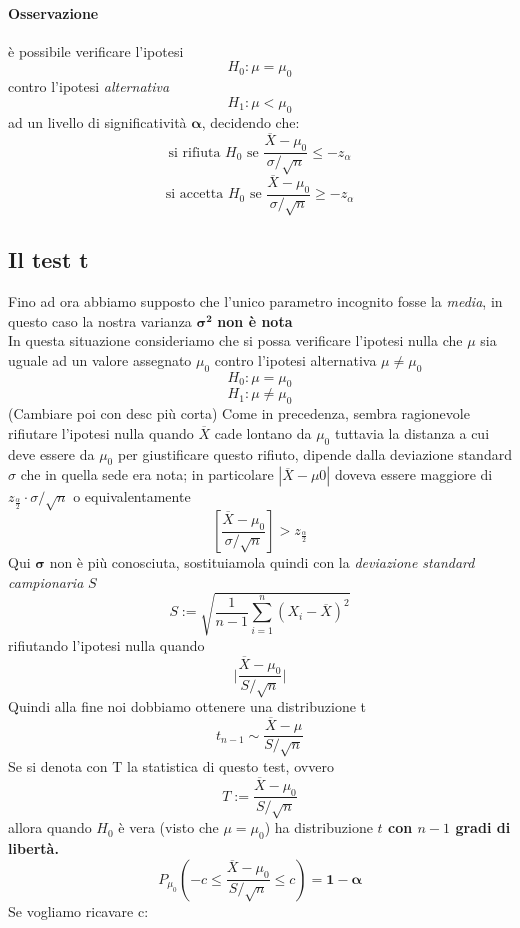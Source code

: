 \documentclass[]{article}
\begin{document}
    \paragraph{Osservazione} è possibile verificare l'ipotesi
    \[ H_0 : \mu = \mu_0 \]
    contro l'ipotesi \textit{alternativa}
    \[ H_1 : \mu < \mu_0 \]
    ad un livello di significatività $\boldsymbol{\alpha}$, decidendo che:
    \[ \text{si rifiuta } H_0 \text{ se } \frac{\overline{X} - \mu_0}{\sigma / \sqrt{n}} \leq -z_\alpha \]
    \[ \text{si accetta } H_0 \text{ se } \frac{\overline{X} - \mu_0}{\sigma / \sqrt{n}} \geq -z_\alpha \]
    \subsection{Il test t}
    Fino ad ora abbiamo supposto che l'unico parametro incognito fosse la \textit{media}, in questo caso la nostra varianza $\boldsymbol{\sigma^2}$ \textbf{non è nota} \\
    In questa situazione consideriamo che si possa verificare l'ipotesi nulla che $\mu$ sia uguale ad un valore assegnato $\mu_0$ contro l'ipotesi alternativa $\mu \not= \mu_0$
    \[ H_0 : \mu = \mu_0 \]
    \[ H_1 : \mu \not= \mu_0 \]
    (Cambiare poi con desc più corta)
    Come in precedenza, sembra ragionevole rifiutare l’ipotesi nulla quando $\overline{X}$ cade
    lontano da $\mu_0$ tuttavia la distanza a cui deve essere da $\mu_0$ per giustificare questo
    rifiuto, dipende dalla deviazione standard $\sigma$ che in quella sede era nota; in particolare
    $|\overline{X} - \mu0|$ doveva essere maggiore di $z_{\frac{\alpha}{2}} \cdot \sigma / \sqrt{n}$ o equivalentamente
    \[ \left[ \frac{\overline{X} - \mu_0}{\sigma / \sqrt{n}} \right] > z_{\frac{\alpha}{2}} \]
    Qui $\boldsymbol{\sigma}$ non è più conosciuta, sostituiamola quindi con la \textit{deviazione standard campionaria} $S$
    \[ S := \sqrt{\frac{1}{n-1} \sum_{i=1}^{n} (X_i - \overline{X})^2} \]
    rifiutando l'ipotesi nulla quando 
    \[ \big\rvert \frac{\overline{X} - \mu_0}{S / \sqrt{n}} \big\rvert \] 
    Quindi alla fine noi dobbiamo ottenere una distribuzione t
    \[  t_{n-1} \sim \frac{\overline{X} - \mu}{S/ \sqrt{n}} \]
    Se si denota con T la statistica di questo test, ovvero 
    \[ T := \frac{\overline{X} - \mu_0}{S / \sqrt{n}} \]
    allora quando $H_0$ è vera (visto che $\mu = \mu_0$) ha distribuzione \textbf{$t$ con $n-1$ gradi di libertà.}
    \[ P_{\mu_0} \left( - c \leq \frac{\overline{X} - \mu_0}{S / \sqrt{n}} \leq c \right) = \boldsymbol{1- \alpha} \]
    Se vogliamo ricavare c:
\end{document}
